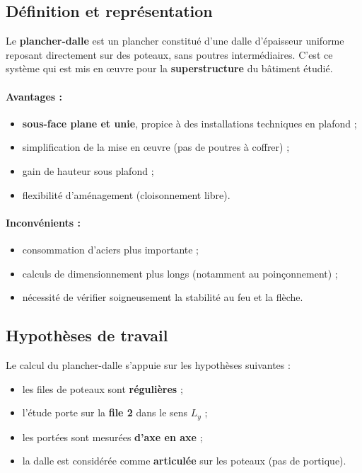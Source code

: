 
\subsection{Définition et représentation}

Le \textbf{plancher-dalle} est un plancher constitué d'une dalle d'épaisseur uniforme reposant directement sur des poteaux, sans poutres intermédiaires. C'est ce système qui est mis en œuvre pour la \textbf{superstructure} du bâtiment étudié.

\paragraph{Avantages :}
\begin{itemize}
  \item \textbf{sous-face plane et unie}, propice à des installations techniques en plafond ;
  \item simplification de la mise en œuvre (pas de poutres à coffrer) ;
  \item gain de hauteur sous plafond ;
  \item flexibilité d'aménagement (cloisonnement libre).
\end{itemize}

\paragraph{Inconvénients :}
\begin{itemize}
  \item consommation d'aciers plus importante ;
  \item calculs de dimensionnement plus longs (notamment au poinçonnement) ;
  \item nécessité de vérifier soigneusement la stabilité au feu et la flèche.
\end{itemize}

\subsection{Hypothèses de travail}

Le calcul du plancher-dalle s'appuie sur les hypothèses suivantes :
\begin{itemize}
  \item les files de poteaux sont \textbf{régulières} ;
  \item l'étude porte sur la \textbf{file 2} dans le sens $L_y$ ;
  \item les portées sont mesurées \textbf{d'axe en axe} ;
  \item la dalle est considérée comme \textbf{articulée} sur les poteaux (pas de portique).
\end{itemize}

